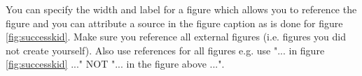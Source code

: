 You can specify the width and label for a figure which allows you to reference the figure and you can attribute a source in the figure caption as is done for figure \ref{fig:successkid}. Make sure you reference all external figures (i.e. figures you did not create yourself). Also use references for all figures e.g. use "... in figure \ref{fig:successkid} ..." NOT "... in the figure above ...".


%
%
%
%

%
%
%
%
